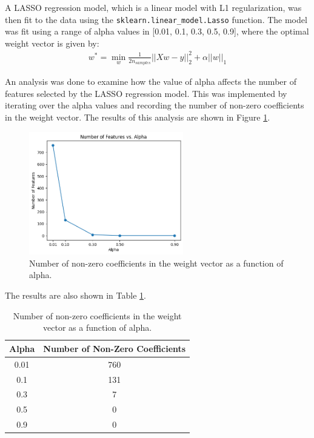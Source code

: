 \documentclass[11pt]{article}
\begin{document}
A LASSO regression model, which is a linear model with L1 regularization, was then fit to the data using the \verb|sklearn.linear_model.Lasso| function. The model was fit using a range of alpha values in [0.01, 0.1, 0.3, 0.5, 0.9], where the optimal weight vector is given by:
\begin{align*}
    w^* = \min_w \frac{1}{2n_{samples}}||Xw-y||_2^2 + \alpha||w||_1
\end{align*}

An analysis was done to examine how the value of alpha affects the number of features selected by the LASSO regression model. This was implemented by iterating over the alpha values and recording the number of non-zero coefficients in the weight vector. The results of this analysis are shown in Figure \ref{fig:lasso_alpha}.

\begin{figure}[H]
    \centering
    \includegraphics[width=0.6\textwidth]{Images/regularization.png}
    \caption{Number of non-zero coefficients in the weight vector as a function of alpha.}
    \label{fig:lasso_alpha}
\end{figure}

\vspace{-0.5cm}

The results are also shown in Table \ref{tab:lasso_alpha}.

\begin{table}[H]
    \centering
    \begin{tabular}{|c|c|}
        \hline 
        \textbf{Alpha} & \textbf{Number of Non-Zero Coefficients} \\
        \hline
        0.01 & 760 \\
        0.1 & 131 \\
        0.3 & 7 \\
        0.5 & 0 \\
        0.9 & 0 \\
        \hline
    \end{tabular}
    \caption{Number of non-zero coefficients in the weight vector as a function of alpha.}
    \label{tab:lasso_alpha}
\end{table}
\end{document}
